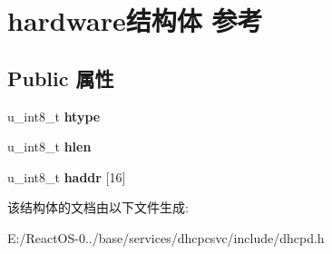 \hypertarget{structhardware}{}\section{hardware结构体 参考}
\label{structhardware}
\subsection*{Public 属性}
\begin{DoxyCompactItemize}
\item 
\mbox{\label{structhardware_ad74972cefb1b7d465ce0ebe242410d96}} 
u\+\_\+int8\+\_\+t {\bfseries htype}
\item 
\mbox{\label{structhardware_a2ea1394699c9b63ad0ef37f7d222a283}} 
u\+\_\+int8\+\_\+t {\bfseries hlen}
\item 
\mbox{\label{structhardware_ae1f44309f3dd01d4d1e27e5344895dc4}} 
u\+\_\+int8\+\_\+t {\bfseries haddr} \mbox{[}16\mbox{]}
\end{DoxyCompactItemize}


该结构体的文档由以下文件生成\+:\begin{DoxyCompactItemize}
\item 
E\+:/\+React\+O\+S-\/0../base/services/dhcpcsvc/include/dhcpd.\+h\end{DoxyCompactItemize}
